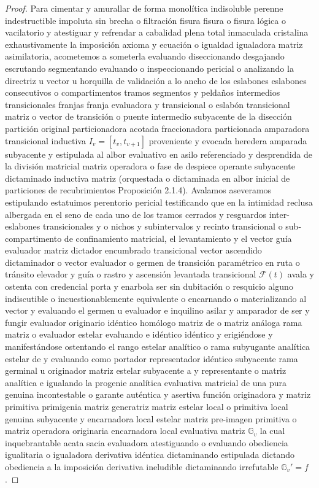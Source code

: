 \documentclass[11pt,a4paper]{article}
\theoremstyle{definition}
\theoremstyle{remark}
\numberwithin{equation}{section}
\begin{document}
\begin{proof}
Para cimentar y amurallar de forma monolítica indisoluble perenne indestructible impoluta sin brecha o filtración fisura fisura o fisura lógica o vacilatorio y atestiguar y refrendar a cabalidad plena total inmaculada cristalina exhaustivamente la imposición axioma y ecuación o igualdad igualadora matriz asimilatoria, acometemos a someterla evaluando diseccionando desgajando escrutando segmentando evaluando o inspeccionando pericial o analizando la directriz u vector u horquilla de validación a lo ancho de los eslabones eslabones consecutivos o compartimentos tramos segmentos y peldaños intermedios transicionales franjas franja evaluadora y transicional o eslabón transicional matriz o vector de transición o puente intermedio subyacente de la disección partición original particionadora acotada fraccionadora particionada amparadora transicional inductiva $I_v = [t_v, t_{v+1}]$ proveniente y evocada heredera amparada subyacente y estipulada al albor evaluativo en asilo referenciado y desprendida de la división matricial matriz operadora o fase de despiece operante subyacente dictaminado inductiva matriz (orquestada o dictaminada en albor inicial de particiones de recubrimientos Proposición 2.1.4).
Avalamos aseveramos estipulando estatuimos perentorio pericial testificando que en la intimidad reclusa albergada en el seno de cada uno de los tramos cerrados y resguardos inter-eslabones transicionales y o nichos y subintervalos y recinto transicional o sub-compartimento de confinamiento matricial, el levantamiento y el vector guía evaluador matriz dictador encumbrado transicional vector ascendido dictaminador o vector evaluador o germen de transición paramétrico en ruta o tránsito elevador y guía o rastro y ascensión levantada transicional $\mathcal{F}(t)$ avala y ostenta con credencial porta y enarbola ser sin dubitación o resquicio alguno indiscutible o incuestionablemente equivalente o encarnando o materializando al vector y evaluando el germen u evaluador e inquilino asilar y amparador de ser y fungir evaluador originario idéntico homólogo matriz de o matriz análoga rama matriz o evaluador estelar evaluando e idéntico idéntico y erigiéndose y manifestándose ostentando el rango estelar analítico o rama subyugante analítica estelar de y evaluando como portador representador idéntico subyacente rama germinal u originador matriz estelar subyacente a y representante o matriz analítica e igualando la progenie analítica evaluativa matricial de una pura genuina incontestable o garante auténtica y asertiva función originadora y matriz primitiva primigenia matriz generatriz matriz estelar local o primitiva local genuina subyacente y encarnadora local estelar matriz pre-imagen primitiva o matriz operadora originaria encarnadora local evaluativa matriz $\mathbb{G}_v$ la cual inquebrantable acata sacia evaluadora atestiguando o evaluando obediencia igualitaria o igualadora derivativa idéntica dictaminando estipulada dictando obediencia a la imposición derivativa ineludible dictaminando irrefutable $\mathbb{G}_v' = f$.

\end{proof}
\end{document}
